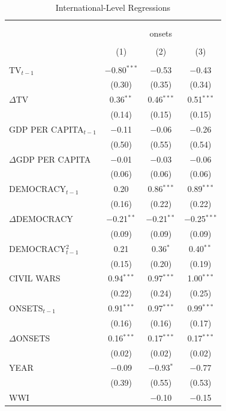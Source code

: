 \documentclass[11pt,article,oneside]{memoir}
\begin{document}
\begin{table}[!htbp] \centering 
  \caption{International-Level Regressions} 
  \label{} 
\scriptsize 
\begin{tabular}{@{\extracolsep{5pt}}lccc} 
\\[-1.8ex]\hline \\[-1.8ex] 
\\[-1.8ex] & \multicolumn{3}{c}{onsets} \\ 
\\[-1.8ex] & (1) & (2) & (3)\\ 
\hline \\[-1.8ex] 
 TV$_{t-1}$ & $-$0.80$^{***}$ & $-$0.53 & $-$0.43 \\ 
  & (0.30) & (0.35) & (0.34) \\ 
  $\Delta$TV & 0.36$^{**}$ & 0.46$^{***}$ & 0.51$^{***}$ \\ 
  & (0.14) & (0.15) & (0.15) \\ 
  GDP PER CAPITA$_{t-1}$ & $-$0.11 & $-$0.06 & $-$0.26 \\ 
  & (0.50) & (0.55) & (0.54) \\ 
  $\Delta$GDP PER CAPITA & $-$0.01 & $-$0.03 & $-$0.06 \\ 
  & (0.06) & (0.06) & (0.06) \\ 
  DEMOCRACY$_{t-1}$ & 0.20 & 0.86$^{***}$ & 0.89$^{***}$ \\ 
  & (0.16) & (0.22) & (0.22) \\ 
  $\Delta$DEMOCRACY & $-$0.21$^{**}$ & $-$0.21$^{**}$ & $-$0.25$^{***}$ \\ 
  & (0.09) & (0.09) & (0.09) \\ 
  DEMOCRACY$^2_{t-1}$ & 0.21 & 0.36$^{*}$ & 0.40$^{**}$ \\ 
  & (0.15) & (0.20) & (0.19) \\ 
  CIVIL WARS & 0.94$^{***}$ & 0.97$^{***}$ & 1.00$^{***}$ \\ 
  & (0.22) & (0.24) & (0.25) \\ 
  ONSETS$_{t-1}$ & 0.91$^{***}$ & 0.97$^{***}$ & 0.99$^{***}$ \\ 
  & (0.16) & (0.16) & (0.17) \\ 
  $\Delta$ONSETS & 0.16$^{***}$ & 0.17$^{***}$ & 0.17$^{***}$ \\ 
  & (0.02) & (0.02) & (0.02) \\ 
  YEAR & $-$0.09 & $-$0.93$^{*}$ & $-$0.77 \\ 
  & (0.39) & (0.55) & (0.53) \\ 
  WWI &  & $-$0.10 & $-$0.15 \\ 

\end{tabular}
\end{table}
\end{document}
